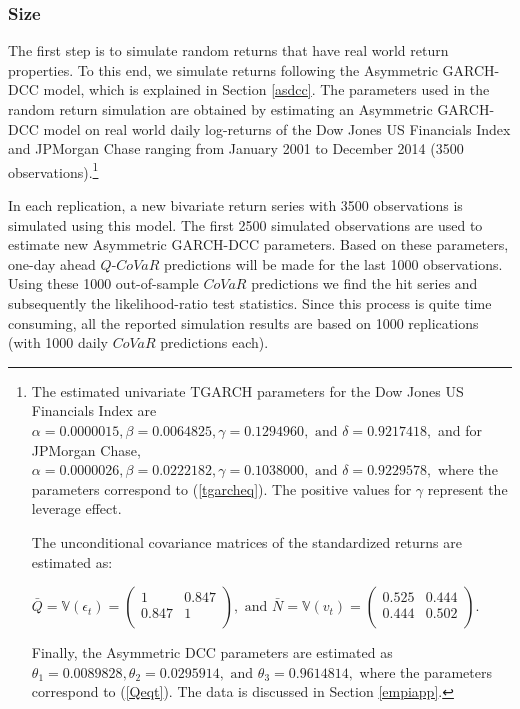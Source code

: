 \documentclass[12pt]{article}
\begin{document}

\subsubsection{Size} \label{sizedistr}

The first step is to simulate random returns that have real world return properties. To this end, we simulate returns following the Asymmetric GARCH-DCC model, which is explained in Section \ref{asdcc}. The parameters used in the random return simulation are obtained by estimating an Asymmetric GARCH-DCC model on real world daily log-returns of the Dow Jones US Financials Index and JPMorgan Chase ranging from January 2001 to December 2014 (3500 observations).\footnote{The estimated univariate TGARCH parameters for the Dow Jones US Financials Index are $\alpha= 0.0000015,\beta=0.0064825,\gamma=0.1294960,\textrm{ and }\delta=0.9217418, $ and for JPMorgan Chase, $\alpha= 0.0000026,\beta=0.0222182,\gamma=0.1038000,\textrm{ and }\delta=0.9229578, $ where the parameters correspond to (\ref{tgarcheq}). The positive values for $\gamma$ represent the leverage effect.

The unconditional covariance matrices of the standardized returns are estimated as:

$ {\bar{Q}}={\mathbb{V}}\left(\epsilon_t\right)=\left(\begin{array}{cc}
1 & 0.847 \\
0.847  & 1\\
\end{array}\right),\textrm{ and }{\bar{N}}={\mathbb{V}}\left(v_t\right)=\left(\begin{array}{cc}
0.525 & 0.444 \\
0.444 & 0.502  \\
\end{array} \right) $.

Finally, the Asymmetric DCC parameters are estimated as $ {\theta}_1 = 0.0089828,{\theta}_2 = 0.0295914,\textrm{ and }{\theta}_3 = 0.9614814, $ where the parameters correspond to (\ref{Qeqt}). The data is discussed in Section \ref{empiapp}.}

In each replication, a new bivariate return series with 3500 observations is simulated using this model. The first 2500 simulated observations are used to estimate new Asymmetric GARCH-DCC parameters. Based on these parameters, one-day ahead $Q$-$CoVaR$ predictions will be made for the last 1000 observations. Using these 1000 out-of-sample $CoVaR$ predictions we find the hit series and subsequently the likelihood-ratio test statistics. Since this process is quite time consuming, all the reported simulation results are based on 1000 replications (with 1000 daily $CoVaR$ predictions each).
\end{document}
